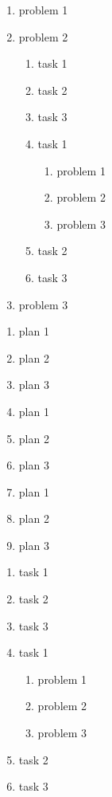 \documentclass[chinese]{working}
\begin{document}
    \problem
        \begin{enumerate}
            \item problem 1
            \item problem 2
              \begin{enumerate}
              \item task 1
              \item task 2
              \item task 3
              \item task 1
                \begin{enumerate}
                \item problem 1
                \item problem 2
                \item problem 3
                \end{enumerate}
              \item task 2
              \item task 3
              \end{enumerate}
            \item problem 3
            \end{enumerate}
    \plan
        \begin{enumerate}
            \item plan 1
            \item plan 2
            \item plan 3
            \item plan 1
            \item plan 2
            \item plan 3
            \item plan 1
            \item plan 2
            \item plan 3
        \end{enumerate}
    \task
    \begin{enumerate}
        \item task 1
        \item task 2
        \item task 3
        \item task 1
        \begin{enumerate}
            \item problem 1
            \item problem 2
            \item problem 3
        \end{enumerate}
        \item task 2
        \item task 3
    \end{enumerate}
\end{document}
